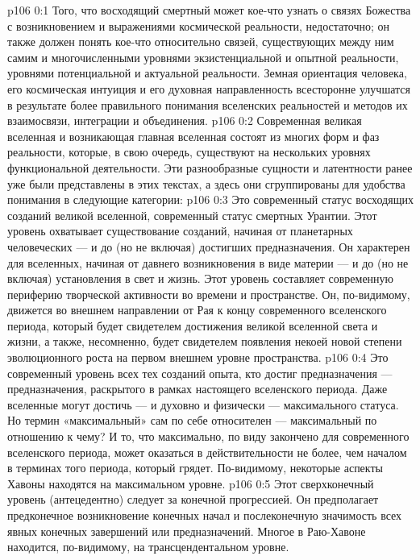 \author{Мелхиседек}
\vs p106 0:1 Того, что восходящий смертный может кое\hyp{}что узнать о связях Божества с возникновением и выражениями космической реальности, недостаточно; он также должен понять кое\hyp{}что относительно связей, существующих между ним самим и многочисленными уровнями экзистенциальной и опытной реальности, уровнями потенциальной и актуальной реальности. Земная ориентация человека, его космическая интуиция и его духовная направленность всесторонне улучшатся в результате более правильного понимания вселенских реальностей и методов их взаимосвязи, интеграции и объединения.
\vs p106 0:2 Современная великая вселенная и возникающая главная вселенная состоят из многих форм и фаз реальности, которые, в свою очередь, существуют на нескольких уровнях функциональной деятельности. Эти разнообразные сущности и латентности ранее уже были представлены в этих текстах, а здесь они сгруппированы для удобства понимания в следующие категории:
\vs p106 0:3 \bibnobreakspace {} Это современный статус восходящих созданий великой вселенной, современный статус смертных Урантии. Этот уровень охватывает существование созданий, начиная от планетарных человеческих --- и до (но не включая) достигших предназначения. Он характерен для вселенных, начиная от давнего возникновения в виде материи --- и до (но не включая) установления в свет и жизнь. Этот уровень составляет современную периферию творческой активности во времени и пространстве. Он, по\hyp{}видимому, движется во внешнем направлении от Рая к концу современного вселенского периода, который будет свидетелем достижения великой вселенной света и жизни, а также, несомненно, будет свидетелем появления некоей новой степени эволюционного роста на первом внешнем уровне пространства.
\vs p106 0:4 \bibnobreakspace {} Это современный уровень всех тех созданий опыта, кто достиг предназначения --- предназначения, раскрытого в рамках настоящего вселенского периода. Даже вселенные могут достичь --- и духовно и физически --- максимального статуса. Но термин «максимальный» сам по себе относителен --- максимальный по отношению к чему? И то, что максимально, по виду закончено для современного вселенского периода, может оказаться в действительности не более, чем началом в терминах того периода, который грядет. По\hyp{}видимому, некоторые аспекты Хавоны находятся на максимальном уровне.
\vs p106 0:5 \bibnobreakspace {} Этот сверхконечный уровень (антецедентно) следует за конечной прогрессией. Он предполагает предконечное возникновение конечных начал и послеконечную значимость всех явных конечных завершений или предназначений. Многое в Раю\hyp{}Хавоне находится, по\hyp{}видимому, на трансцендентальном уровне.
